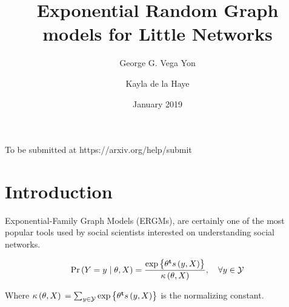 \documentclass[12pt]{article}
\title{Exponential Random Graph models for Little Networks}
\author{George G. Vega Yon \and Kayla de la Haye}
\date{January 2019}
\begin{document}
\maketitle

To be submitted at https://arxiv.org/help/submit

\section{Introduction}

Exponential-Family Graph Models (ERGMs), are certainly one of the most popular tools used by social scientists interested on understanding social networks.

\begin{equation}
\label{eq:ergm}
  \Prcond{\Adjmat = \adjmat}{\params, \Indepvar} = \frac{%
  	\exp{\transpose{\params}\sufstats{\adjmat, \Indepvar}}%
  }{
  	\kappa\left(\params, \Indepvar\right)
  },\quad\forall \adjmat\in\ADJMAT
\end{equation}

Where $\kappa\left(\theta, X\right){} = \sum_{y\in\mathcal{Y}}\mbox{exp}\left\{{\theta}^\mathbf{t}s\left(y, X\right)\right\}$ is the normalizing constant.
\end{document}
